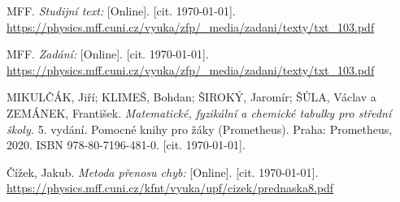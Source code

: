 
\begin{thebibliography}{9}
 MFF. \emph{Studijní text:} [Online]. [cit. \today]. \newline \url{https://physics.mff.cuni.cz/vyuka/zfp/_media/zadani/texty/txt_103.pdf}

 MFF. \emph{Zadání:} [Online]. [cit. \today]. \newline \url{https://physics.mff.cuni.cz/vyuka/zfp/_media/zadani/texty/txt_103.pdf}

 MIKULČÁK, Jiří; KLIMEŠ, Bohdan; ŠIROKÝ, Jaromír; ŠŮLA, Václav a ZEMÁNEK, František. \emph{Matematické, fyzikální a chemické tabulky pro střední školy.} 5. vydání. Pomocné knihy pro žáky (Prometheus). Praha: Prometheus, 2020. ISBN 978-80-7196-481-0. [cit. \today].

 Čížek, Jakub. \emph{Metoda přenosu chyb:} [Online]. [cit. \today]. \newline \url{https://physics.mff.cuni.cz/kfnt/vyuka/upf/cizek/prednaska8.pdf}

\end{thebibliography}
